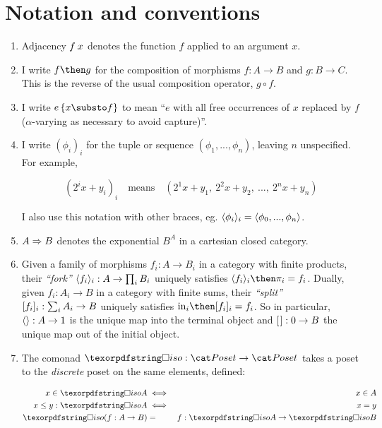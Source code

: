 \documentclass{rntz}\usepackage{fantasy}%
\begin{document}


\section{Notation and conventions}

\begin{enumerate}
\item Adjacency $f\<x$ denotes the function $f$ applied to an argument $x$.

\item I write $f \then g$ for the composition of morphisms $f : A \to B$ and $g
  : B \to C$. This is the reverse of the usual composition operator, $g \circ
  f$.

\item I write $\subst{e}{x \substo f}$ to mean ``$e$ with all free occurrences of $x$
  replaced by $f$ ($\alpha$-varying as necessary to avoid capture)''.

  \newcommand\iexpr{\phi}
\item I write $(\iexpr_i)_i$ for the tuple or sequence $(\iexpr_1,
  ..., \iexpr_n)$, leaving $n$ unspecified. For example,

  \nopagebreak[2]
  \[ (2^ix + y_i)_i \quad\text{means}\quad
  (2^1x + y_1,~ 2^2x + y_2,~ ...,~ 2^nx + y_n) \]

  \noindent
  I also use this notation with other braces, eg. $\fork{\iexpr_i}_i =
  \fork{\iexpr_0, ..., \iexpr_n}$.

\item $A \Rightarrow B$ denotes the exponential $B^A$ in a cartesian closed category.

\item Given a family of morphisms $f_i : A \to B_i$ in a category with finite
  products, their \emph{``fork''} $\langle{f_i}\rangle_i : A \to \textstyle\prod_{i} B_i$
  uniquely satisfies $\fork{f_i}_i \then \pi_i = f_i$. Dually, given $f_i : A_i
  \to B$ in a category with finite sums, their \emph{``split''} $[{f_i}]_i :
  \sum_i A_i \to B$ uniquely satisfies $\injc_i \then \krof{f_i}_i = f_i$.
  So in particular, $\langle{}\rangle : A \to 1$ is the unique map into the terminal
  object and $[{\kern .08em}] : 0 \to B$ the unique map out of the initial object.

\item The comonad $\iso : \Poset \to \Poset$ takes a poset to the
  \emph{discrete} poset on the same elements, defined:

  \begin{eqnarray*}
    x \in \isof A &\iff& x \in A\\
    x \le y : \isof A &\iff& x = y\\
    \isof(f : A \to B) &=& f : \isof A \to \isof B
  \end{eqnarray*}
\end{enumerate}
\end{document}
